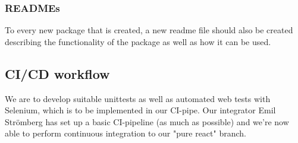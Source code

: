 \subsubsection{READMEs}
To every new package that is created, a new readme file should also be created describing the functionality of the package as well as how it can be used. 



\subsection{CI/CD workflow}
We are to develop suitable unittests as well as automated web tests with Selenium, which is to be implemented in our CI-pipe. Our integrator Emil Strömberg has set up a basic CI-pipeline (as much as possible) and we're now able to perform continuous integration to our "pure react" branch.
